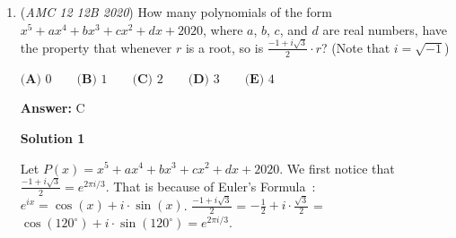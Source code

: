 \begin{enumerate}
\textbf{Solution 8 (Easier Solution)}

Basically, George is picking a ball and adding another ball of that color to the urn. Basically, he needs to pick a red ball twice and a blue ball twice to get 3 red and 3 blue balls in the urn. The number of ways to choose a red ball twice is $1\cdot 2$ (at the start there's 1 red ball, then he needs to choose it again when there's 2, and then there is 3 red balls so he doesn't need to choose it again). Similarly the number of ways to choose blue balls twice is 2. $2\cdot 2$ = 4 ways to choose 2 red balls and 2 blue balls (not considering order). The total number of ways is $2\cdot 3\cdot 4\cdot 5$. Adding order to the 4 ways to choose 2 red and 2 blue balls, it is 4C2 because out of the 4 ball choosings, 2 of them must be red, and we automatically make the other ones blue. $\frac{\binom42 \cdot 2 \cdot 2}{2 \cdot 3 \cdot 4 \cdot 5} = \frac{1}{5}$.

 



\textbf{Solution 9 (Desperate Guess)}

Notice that the answer can either be (1R, 5B) (2R, 4B) (3R, 3B) (4R, 2B) or (5R, 1B). Also, the answer choices are all really basic. Just guess that each of these cases are equal by symmetry so the probability of (3R, 3B) is $\boxed{\textbf{(B)}\ \frac{1}{5}}$.

 -unhappyfarmer

 


	\item (\textit{AMC 12 12B 2020}) How many polynomials of the form $x^5 + ax^4 + bx^3 + cx^2 + dx + 2020$, where $a$, $b$, $c$, and $d$ are real numbers, have the property that whenever $r$ is a root, so is $\frac{-1+i\sqrt{3}}{2} \cdot r$? (Note that $i=\sqrt{-1}$)


 $\textbf{(A) } 0 \qquad \textbf{(B) }1 \qquad \textbf{(C) } 2 \qquad \textbf{(D) } 3 \qquad \textbf{(E) } 4$

 \textbf{Answer: }C



\textbf{Solution 1}

Let $P(x) = x^5+ax^4+bx^3+cx^2+dx+2020$. We first notice that $\frac{-1+i\sqrt{3}}{2} = e^{2\pi i / 3}$.  That is because of Euler's Formula : $e^{ix} = \cos(x) + i \cdot \sin(x)$. $\frac{-1+i\sqrt{3}}{2}$ = $-\frac{1}{2} + i \cdot \frac {\sqrt{3}}{2}$ = $\cos(120^\circ) + i \cdot \sin(120^\circ) = e^{ 2\pi i / 3}$.


\end{enumerate}
